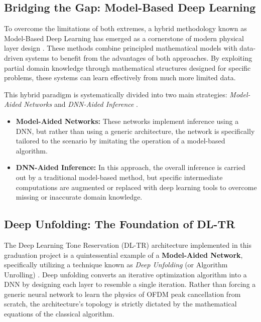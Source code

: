 \subsection{Bridging the Gap: Model-Based Deep Learning}
To overcome the limitations of both extremes, a hybrid methodology known as Model-Based Deep Learning has emerged as a cornerstone of modern physical layer design \cite{modelbased}. These methods combine principled mathematical models with data-driven systems to benefit from the advantages of both approaches. By exploiting partial domain knowledge through mathematical structures designed for specific problems, these systems can learn effectively from much more limited data.

This hybrid paradigm is systematically divided into two main strategies: \textit{Model-Aided Networks} and \textit{DNN-Aided Inference} \cite{modelbased}.
\begin{itemize}
    \item \textbf{Model-Aided Networks:} These networks implement inference using a DNN, but rather than using a generic architecture, the network is specifically tailored to the scenario by imitating the operation of a model-based algorithm.
    \item \textbf{DNN-Aided Inference:} In this approach, the overall inference is carried out by a traditional model-based method, but specific intermediate computations are augmented or replaced with deep learning tools to overcome missing or inaccurate domain knowledge.
\end{itemize}

\subsection{Deep Unfolding: The Foundation of DL-TR}
The Deep Learning Tone Reservation (DL-TR) architecture implemented in this graduation project is a quintessential example of a \textbf{Model-Aided Network}, specifically utilizing a technique known as \textit{Deep Unfolding} (or Algorithm Unrolling) \cite{dl_tr}. Deep unfolding converts an iterative optimization algorithm into a DNN by designing each layer to resemble a single iteration. Rather than forcing a generic neural network to learn the physics of OFDM peak cancellation from scratch, the architecture's topology is strictly dictated by the mathematical equations of the classical algorithm.

